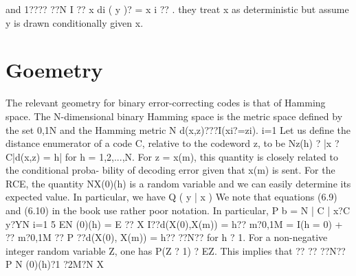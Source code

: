 \documentclass[letterpaper,english,10pt]{article}
\begin{document}
and
1???? ??N
I ?? x di ( y )? = x i ?? .
they treat x as deterministic but assume y is drawn conditionally given x.
\section{Goemetry}
The relevant geometry for binary error-correcting codes is that of Hamming space. The N-dimensional binary Hamming space is the metric space defined by the set {0,1}N and the Hamming metric
N d(x,z)???I(xi?=zi).
i=1
Let us define the distance enumerator of a code C, relative to the codeword z, to be
Nz(h) ? |{x ? C|d(x,z) = h}|
for h = 1,2,...,N. For z = x(m), this quantity is closely related to the conditional proba- bility of decoding error given that x(m) is sent.
For the RCE, the quantity NX(0)(h) is a random variable and we can easily determine its expected value. In particular, we have
Q ( y | x )
We note that equations (6.9) and (6.10) in the book use rather poor notation. In particular,
P b = N | C |
x?C y?YN
i=1
5
                    EN (0)(h) = E ?? X
I??d(X(0),X(m)) = h??
   m?{0,1}M
= I(h = 0) + ??
m?{0,1}M \0 ??
P ??d(X(0), X(m)) = h??
??N??
for h ? 1. For a non-negative integer random variable Z, one has P(Z ? 1) ? EZ. This implies that
?? ?? ??N??
P N (0)(h)?1 ?2M?N X
\end{document}
